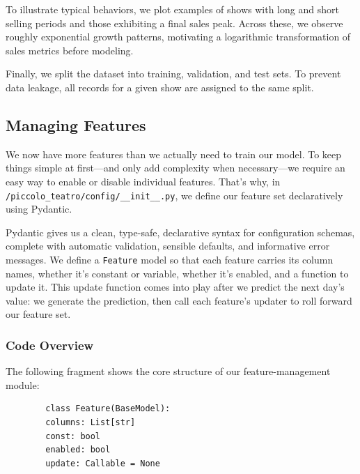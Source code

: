 \documentclass[a4paper,12pt]{report}  %
\begin{document}
    To illustrate typical behaviors, we plot examples of shows with long and short selling periods and those exhibiting a final sales peak. Across these, we observe roughly exponential growth patterns, motivating a logarithmic transformation of sales metrics before modeling.

    
    Finally, we split the dataset into training, validation, and test sets. To prevent data leakage, all records for a given show are assigned to the same split.
  
  
  \subsection{Managing Features}
    We now have more features than we actually need to train our model. 
    To keep things simple at first—and only add complexity when necessary—we require an easy way to 
    enable or disable individual features. 
    That’s why, in \verb|/piccolo_teatro/config/__init__.py|, we define our feature set declaratively using Pydantic.

    Pydantic gives us a clean, type-safe, declarative syntax for configuration schemas, 
    complete with automatic validation, sensible defaults, and informative error messages. 
    We define a \texttt{Feature} model so that each feature carries its column names, 
    whether it’s constant or variable, whether it’s enabled, and a function to update it. 
    This update function comes into play after we predict the next day’s value: we generate the prediction, 
    then call each feature’s updater to roll forward our feature set.
    \subsubsection{Code Overview}
    The following fragment shows the core structure of our feature-management module:
      \begin{verbatim}
        class Feature(BaseModel):
        columns: List[str]
        const: bool
        enabled: bool
        update: Callable = None
      \end{verbatim}
\end{document}
